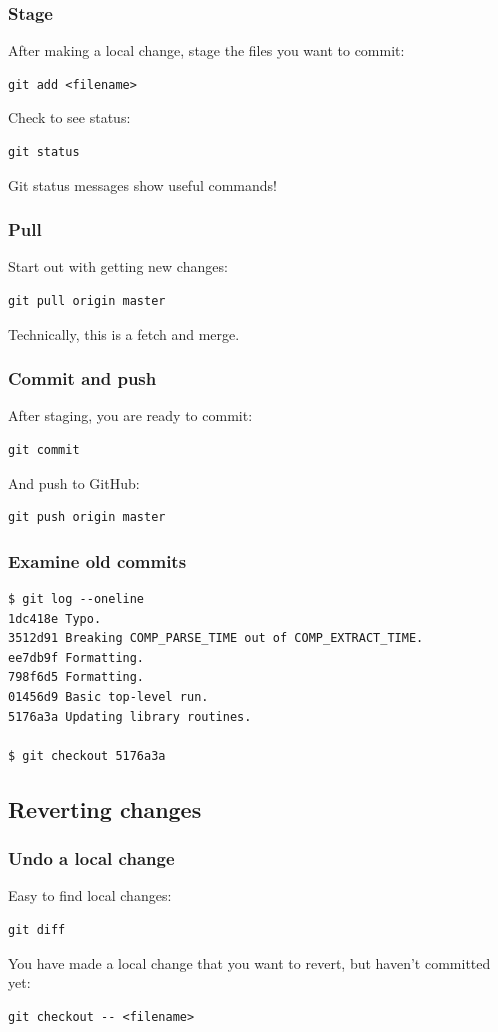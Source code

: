 \documentclass{beamer}
\begin{document}
\begin{frame}[fragile]
  \frametitle{Stage}
After making a local change, stage the files you want to commit:
  \begin{lstlisting}
git add <filename>
  \end{lstlisting}
Check to see status:
  \begin{lstlisting}
git status
  \end{lstlisting}
Git status messages show useful commands!
\end{frame}

\begin{frame}[fragile]
  \frametitle{Pull}
Start out with getting new changes:
  \begin{lstlisting}
git pull origin master
  \end{lstlisting}
Technically, this is a fetch and merge.
\end{frame}

\begin{frame}[fragile]
  \frametitle{Commit and push}
After staging, you are ready to commit:
  \begin{lstlisting}
git commit
  \end{lstlisting}
And push to GitHub:
  \begin{lstlisting}
git push origin master
  \end{lstlisting}
\end{frame}

\begin{frame}[fragile]
  \frametitle{Examine old commits}
  \begin{small}
  \begin{lstlisting}
$ git log --oneline
1dc418e Typo.
3512d91 Breaking COMP_PARSE_TIME out of COMP_EXTRACT_TIME.
ee7db9f Formatting.
798f6d5 Formatting.
01456d9 Basic top-level run.
5176a3a Updating library routines.

$ git checkout 5176a3a
  \end{lstlisting}
  \end{small}
\end{frame}


\subsection{Reverting changes}
\begin{frame}[fragile]
  \frametitle{Undo a local change}
Easy to find local changes:
  \begin{lstlisting}
git diff
  \end{lstlisting}
You have made a local change that you want to revert, but haven't committed yet:
  \begin{lstlisting}
git checkout -- <filename>
  \end{lstlisting}
\end{frame}
\end{document}
